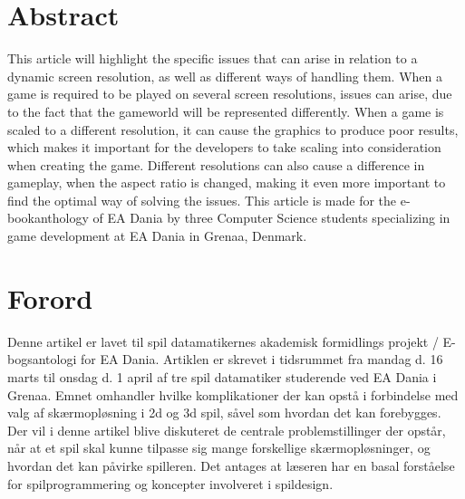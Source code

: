 



	\maketitle

\chapter*{Abstract}
This article will highlight the specific issues that can arise in relation to a dynamic screen resolution, as well as different ways of handling them.
When a game is required to be played on several screen resolutions, issues can arise, due to the fact that the gameworld will be represented differently. When a game is scaled to a different resolution, it can cause the graphics to produce poor results, which makes it important for the developers to take scaling into consideration when creating the game. Different resolutions can also cause a difference in gameplay, when the aspect ratio is changed, making it even more important to find the optimal way of solving the issues.
This article is made for the e-bookanthology of EA Dania by three Computer Science students specializing in game development at EA Dania in Grenaa, Denmark.

\chapter*{Forord}
Denne artikel er lavet til spil datamatikernes akademisk formidlings projekt / E-bogsantologi for EA Dania. Artiklen er skrevet i tidsrummet fra mandag d. 16 marts til onsdag d. 1 april af tre spil datamatiker studerende ved EA Dania i Grenaa.
Emnet omhandler hvilke komplikationer der kan opstå i forbindelse med valg af skærmopløsning i 2d og 3d spil, såvel som hvordan det kan forebygges. Der vil i denne artikel blive diskuteret de centrale problemstillinger der opstår, når at et spil skal kunne tilpasse sig mange forskellige skærmopløsninger, og hvordan det kan påvirke spilleren. 
Det antages at læseren har en basal forståelse for spilprogrammering og koncepter involveret i spildesign.

	\newpage
		\pagestyle{plain}
		\lhead{} \chead{} \rhead{} \lfoot{} \cfoot{} \rfoot{} 	
	
	\tableofcontents
	
	
	\newpage	
	
	\pagestyle{fancy}
		\lhead{\leftmark}
		\renewcommand{\headrulewidth}{0.4pt}
		\renewcommand{\footrulewidth}{0.4pt}
	
	\setcounter{page}{1}	
		
		
		
		\clearpage	
		
		

		\clearpage	
	
		
		
		\clearpage		
			
		
		
		\clearpage
		
	\printbibliography


